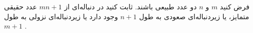 \EXERCISE
فرض کنید
$m$
و
$n$
دو عدد طبیعی باشند. ثابت کنید در دنباله‌ای از
$mn + 1$
عدد حقیقی متمایز، یا زیردنباله‌ای صعودی به طول
$n + 1$
وجود دارد یا زیردنباله‌ای نزولی به طول
$m + 1$
.